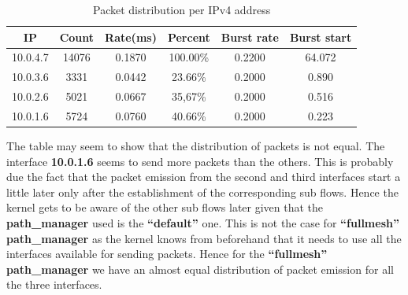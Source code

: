 \documentclass[a4paper,11pt]{article}
\begin{document}
			\begin{table}[h]
				
				
				\centering
				\begin{tabular}{|c|c|c|c|c|c|}
					\hline
					IP & Count & Rate(ms) & Percent & Burst rate & Burst start \\
					\hline
					\hline
					10.0.4.7 & 14076 & 0.1870 & 100.00\% & 0.2200 & 64.072 \\
					\hline
					10.0.3.6 & 3331 & 0.0442 & 23.66\% & 0.2000 & 0.890 \\
					\hline
					10.0.2.6 & 5021 & 0.0667 & 35,67\% & 0.2000 & 0.516 \\
					\hline
					10.0.1.6 & 5724 & 0.0760 & 40.66\% & 0.2000 & 0.223 \\
					\hline
				\end{tabular}
				\caption{Packet distribution per IPv4 address}
			\end{table}

			The table may seem to show that the distribution of packets is not equal. The interface \textbf{10.0.1.6} seems to send more packets than the others. This is probably due the fact that the packet emission from the second and third interfaces start a little later only after the establishment of the corresponding sub flows. Hence the kernel gets to be aware of the other sub flows later given that the \textbf{path\_manager} used is the \textbf{``default''} one. This is not the case for \textbf{``fullmesh'' path\_manager} as the kernel knows from beforehand that it needs to use all the interfaces available for sending packets. Hence for the \textbf{``fullmesh'' path\_manager} we have an almost equal distribution of packet emission for all the three interfaces.
\end{document}
